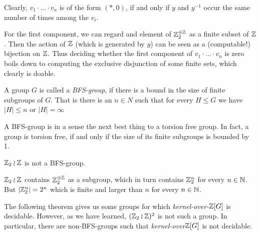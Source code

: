 	Clearly, $v_1 \cdot ... \cdot v_n$ is of the form $(*,0)$, if and only if $y$ and $y^{-1}$ occur the same number of times among the $v_i$.\footnotemark

	For the first component, we can regard and element of $\mathbb{Z}_2^{\oplus \mathbb{Z}}$ as a finite subset of $\mathbb{Z}$.
	Then the action of $\mathbb{Z}$ (which is generated by $y$) can be seen as a (computable!) bijection on $\mathbb{Z}$.
	Thus deciding whether the first component of $v_1 \cdot ... \cdot v_n$ is zero boils down to computing the exclusive disjunction of some finite sets, which clearly is doable.
\endproof

\begin{Definition}
	A group $G$ is called a \emph{BFS-group}, if there is a bound in the size of finite subgroups of $G$.
	That is there is an $n \in N$ such that for every $H \leq G$ we have $|H| \leq n$ or $|H| = \infty$
\end{Definition}

\begin{Remark}
	A BFS-group is in a sense the next best thing to a torsion free group.
	In fact, a group is torsion free, if and only if the size of its finite subgroups is bounded by 1.
\end{Remark}

\begin{Example}
	$\mathbb{Z}_2 \wr \mathbb{Z}$ is not a BFS-group.
\end{Example}
\proof
	$\mathbb{Z}_2 \wr \mathbb{Z}$ contains $\mathbb{Z}_2^{\oplus \mathbb{Z}}$ as a subgroup, which in turn contains $\mathbb{Z}_2^n$ for every $n \in \mathbb{N}$. But $|\mathbb{Z}_2^n| = 2^n$ which is finite and larger than $n$ for every $n \in \mathbb{N}$.
\endproof

The following theorem gives us some groups for which \emph{kernel-over-$\mathbb{Z}[G]$} is decidable.
However, as we have learned, $(\mathbb{Z}_2 \wr \mathbb{Z})^2$ is not such a group.
In particular, there are non-BFS-groups such that \emph{kernel-over$\mathbb{Z}[G]$} is not decidable.


